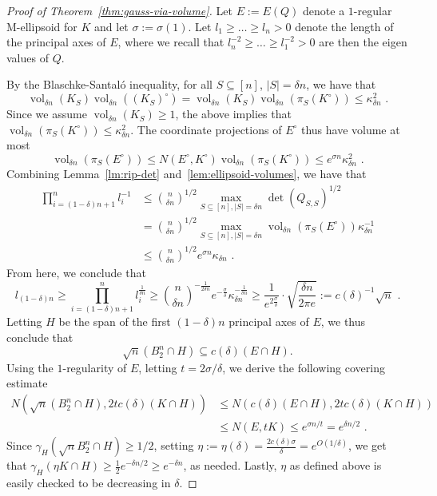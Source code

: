 \documentclass[11pt]{article}
\DeclareMathOperator{\vol}{vol}
\begin{document}
\begin{proof}[Proof of Theorem~\ref{thm:gauss-via-volume}]
Let $E := E(Q)$ denote a $1$-regular M-ellipsoid for $K$ and let $\sigma :=
\sigma(1)$. Let $l_1 \geq \dots \geq l_n > 0$ denote
the length of the principal axes of $E$, where we recall that
$l_n^{-2}\geq \dots \geq l_1^{-2} > 0$ are then the eigen values of $Q$.

By the Blaschke-Santal{\'o} inequality, for all $S \subseteq
[n]$, $|S|=\delta n$, we have that 
\[
\vol_{\delta n}(K_S)\vol_{\delta n}((K_S)^\circ) = 
\vol_{\delta n}(K_S) \vol_{\delta n}(\pi_S(K^\circ)) \leq
\kappa_{\delta n}^2 \text{ .}
\]
Since we assume $\vol_{\delta n}(K_S) \geq 1$, the above implies that
$\vol_{\delta n}(\pi_S(K^\circ)) \leq \kappa_{\delta n}^2$. The
coordinate projections of $E^\circ$ thus have volume at most 
\[
\vol_{\delta n}(\pi_S(E^\circ)) \leq N(E^\circ,K^\circ)
\vol_{ \delta n}(\pi_S(K^\circ)) \leq e^{\sigma n} \kappa_{\delta n}^2 \text{ .}
\]
Combining Lemma~\ref{lm:rip-det} and~\ref{lem:ellipsoid-volumes}, we have that
\begin{align*}
\prod_{i=(1-\delta)n+1}^n l_i^{-1} &\leq \binom{n}{\delta n}^{1/2} \max_{S \subseteq
[n],|S|=\delta n} \det(Q_{S,S})^{1/2} \\
&= \binom{n}{\delta n}^{1/2} \max_{S \subseteq [n],|S|=\delta n}
\vol_{\delta n}(\pi_S(E^\circ)) \kappa_{\delta n}^{-1} \\
&\leq \binom{n}{\delta n}^{1/2} e^{\sigma n} \kappa_{\delta n} \text{ .}
\end{align*}
From here, we conclude that 
\begin{equation}
\label{eq:axis-long}
l_{(1-\delta)n} \geq \prod_{i=(1-\delta)n+1}^n l_i^{\frac{1}{\delta
n}} \geq \binom{n}{\delta 
n}^{-\frac{1}{2\delta n}} e^{-\frac{\sigma}{\delta }} \kappa_{\delta
n}^{-\frac{1}{\delta n}} \geq 
\frac{1}{e^{2\frac{\sigma}{\delta }}} \cdot \sqrt{\frac{\delta n}{2\pi e}} :=
c(\delta)^{-1} \sqrt{n} \text{ .}
\end{equation}
Letting $H$ be the span of the first $(1-\delta)n$ principal
axes of $E$, we thus conclude that 
\[
\sqrt{n} (B_2^n \cap H) \subseteq c(\delta) (E \cap H). 
\]
Using the $1$-regularity of $E$, letting $t = 2 \sigma / \delta$, we derive the
following covering estimate 
\begin{align*}
N(\sqrt{n} (B_2^n \cap H), 2 t c(\delta) (K \cap H))
&\leq N(c(\delta)(E \cap H), 2 t c(\delta) (K \cap H)) \\
&\leq N(E, t K) \leq e^{\sigma n / t} = e^{\delta n/2} \text{ .}
\end{align*}
Since $\gamma_H(\sqrt{n} B_2^n \cap H) \geq 1/2$, setting $\eta := \eta(\delta)
=\frac{2c(\delta)\sigma}{\delta} = e^{O(1/\delta)}$, we get that $\gamma_H(\eta K
\cap H) \geq \frac{1}{2} e^{-\delta n/2} \geq e^{-\delta n}$, as needed. Lastly,
$\eta$ as defined above is easily checked to be decreasing in $\delta$.
\end{proof}
\end{document}
